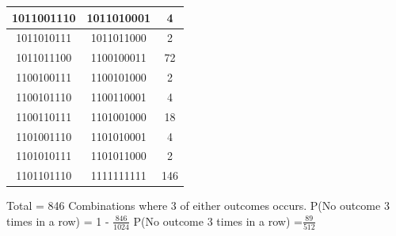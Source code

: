 \documentclass{article}
\begin{document}
\begin{center}
\begin{tabular}{|c|c|c|}
	\hline
	1011001110&1011010001&4\\
	\hline
	1011010111&1011011000&2\\
	\hline
	1011011100&1100100011&72\\
	\hline
	1100100111&1100101000&2\\
	\hline
	1100101110&1100110001&4\\
	\hline
	1100110111&1101001000&18\\
	\hline
	1101001110&1101010001&4\\
	\hline
	1101010111&1101011000&2\\
	\hline
	1101101110&1111111111&146\\
	\hline
	\end{tabular}
	\end{center}
	Total = 846 Combinations where 3 of either outcomes occurs.
	\newline
	P(No outcome 3 times in a row) = 1 - $\frac{846}{1024}$
	\newline
	P(No outcome 3 times in a row) =$\frac{89}{512}$
	
\end{document}
